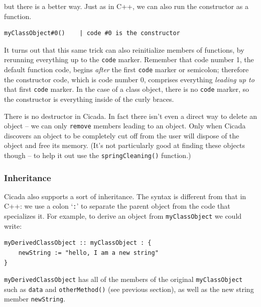 \documentclass{article}
\newenvironment{code}{
       \begin{list}{}{
               \setlength{\leftmargin}{.4in}
               \setlength{\rightmargin}{0in}
               \setlength{\topsep}{.2in}
       }
       \small
       \item[] }
       { \end{list}   }
\begin{document}
\noindent but there is a better way.  Just as in C++, we can also run the constructor as a function.

\begin{code} \begin{verbatim}
myClassObject#0()    | code #0 is the constructor
\end{verbatim} \end{code}

\noindent It turns out that this same trick can also reinitialize members of functions, by rerunning everything up to the \verb#code# marker.  Remember that code number 1, the default function code, begins \emph{after} the first \verb#code# marker or semicolon; therefore the constructor code, which is code number 0, comprises everything \emph{leading up to} that first \verb#code# marker.  In the case of a class object, there is no \verb#code# marker, so the constructor is everything inside of the curly braces.

There is no destructor in Cicada.  In fact there isn't even a direct way to delete an object -- we can only \verb#remove# members leading to an object.  Only when Cicada discovers an object to be completely cut off from the user will dispose of the object and free its memory.  (It's not particularly good at finding these objects though -- to help it out use the \texttt{springCleaning()} function.)








\subsubsection{Inheritance}

Cicada also supports a sort of inheritance.  The syntax is different from that in C++:  we use a colon `\verb#:#' to separate the parent object from the code that specializes it.  For example, to derive an object from \verb#myClassObject# we could write:

\begin{code} \begin{verbatim}
myDerivedClassObject :: myClassObject : {
    newString := "hello, I am a new string"
}
\end{verbatim} \end{code}

\noindent \verb#myDerivedClassObject# has all of the members of the original \verb#myClassObject# such as \verb#data# and \verb#otherMethod()# (see previous section), as well as the new string member \verb#newString#.
\end{document}

